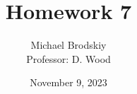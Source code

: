 


\title{Homework 7}
\date{November 9, 2023}
\author{Michael Brodskiy\\ \small Professor: D. Wood}



\maketitle

